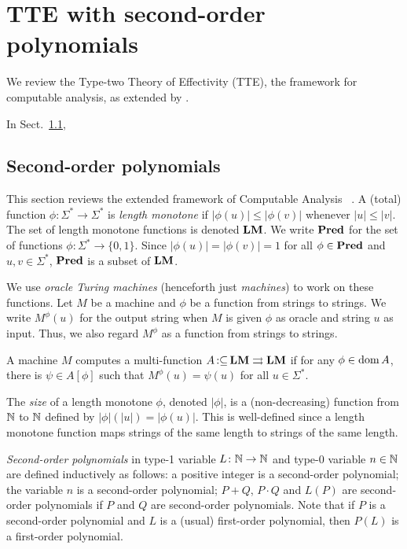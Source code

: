 \documentclass[envcountsame,orivec,oribibl]{llncs}
\newcommand{\pcolon}{\mathpunct{\,:\subseteq}}
\begin{document}
\section{TTE with second-order polynomials}
\label{section: computable analysis}

We review the Type-two Theory of Effectivity (TTE), 
the framework for computable analysis, 
as extended by 
\cite{kawamura2012complexity}. 

In Sect.~\ref{section:TTF}, 

\subsection{Second-order polynomials}
\label{section:TTF}

This section reviews the extended framework of Computable Analysis~%
\cite{kawamura2012complexity}.
A (total) function $\phi \colon \Sigma^* \to \Sigma^*$ is \emph{length monotone}
if  $|\phi(u)| \le |\phi(v)|$ whenever $|u| \le |v|$.
The set of length monotone functions is denoted $\mathbf{LM}$.
We write $\mathbf{Pred}$ for the set of functions $\phi \colon \Sigma^* \to \{0, 1\}$.
Since $|\phi(u)| = |\phi(v)| = 1$ for all $\phi \in \mathbf{Pred}$ and $u, v \in \Sigma^*$,
$\mathbf{Pred}$ is a subset of $\mathbf{LM}$.

We use \emph{oracle Turing machines} (henceforth just \emph{machines})
to work on these functions.
Let $M$ be a machine and $\phi$ be a function from strings to strings. 
We write $M ^\phi (u)$ for the output string 
when $M$ is given
$\phi$ as oracle and string $u$ as input.
Thus, we also regard $M^\phi$ as a function from strings to strings.


\begin{definition}
 A machine $M$ computes a multi-function $A \pcolon \LM \rightrightarrows \LM$ if for any
 $\phi \in \mathop{\rm dom} A$, there is $\psi \in A[\phi]$ such that $M^\phi(u) = \psi(u)$ for all $u \in \Sigma^*$.
\end{definition}

The \emph{size} of a length monotone $\phi$, denoted $|\phi|$,
is a (non-decreasing) function from $\mathbb N$ to $\mathbb N$ defined by 
$|\phi|(|u|) = |\phi(u)|$.
This is well-defined since a length monotone function maps 
strings of the same length to strings of the same length.

\emph{Second-order polynomials} in type-1 variable $L \colon \mathbb N \to \mathbb N$
and type-0 variable $n \in \mathbb N$ 
are defined inductively as follows:
a positive integer is a second-order polynomial;
the variable $n$ is a second-order polynomial;
$P+Q$, $P \cdot Q$ and $L(P)$ are
second-order polynomials if $P$ and $Q$ are second-order polynomials.
Note that if $P$ is a second-order polynomial and $L$ is a (usual) first-order
polynomial, then $P(L)$ is a first-order polynomial.
\end{document}

